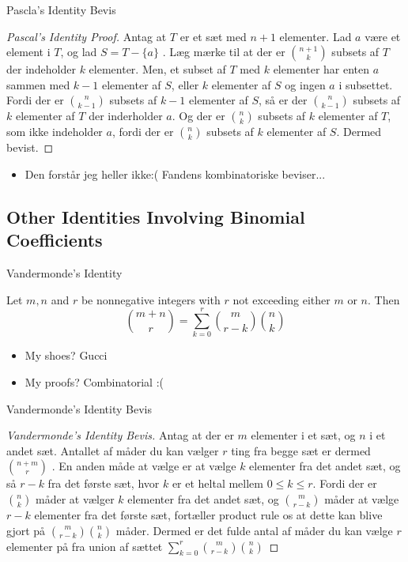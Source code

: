 \documentclass{beamer}
\begin{document}
\begin{frame}{Pascla's Identity Bevis}
   \begin{proof}[Pascal's Identity Proof]
      Antag at $T$ er et sæt med $n+1$ elementer. Lad $a$ være et element i $T$, og lad $S = T - \{a\}$ . Læg mærke til at der er $\binom{n+1}{k}$ subsets af $T$ der indeholder $k$ elementer. Men, et subset af $T$ med $k$ elementer har enten $a$ sammen med $k-1$ elementer af $S$, eller $k$ elementer af $S$ og ingen $a$ i subsettet. Fordi der er $\binom{n}{k-1}$ subsets af $k-1$ elementer af $S$, så er der $\binom{n}{k-1}$ subsets af $k$ elementer af $T$ der inderholder $a$. Og der er $\binom{n}{k}$ subsets af $k$ elementer af $T$, som ikke indeholder $a$, fordi der er $\binom{n}{k}$ subsets af $k$ elementer af $S$. Dermed bevist.
   \end{proof} 
   \begin{itemize}
       \item Den forstår jeg heller ikke:( Fandens kombinatoriske beviser...
   \end{itemize}
\end{frame}

\subsection{Other Identities Involving Binomial Coefficients}
\begin{frame}{Vandermonde's Identity}
\begin{theorem}
   Let $m,n $ and $r$ be nonnegative integers with $r$ not exceeding either $m$ or $n$. Then
   $$\binom{m+n}{r} = \sum^r_{k=0} \binom{m}{r-k} \binom{n}{k}$$
\end{theorem}
\begin{itemize}
    \item My shoes? Gucci
    \item My proofs? Combinatorial :(
\end{itemize}
\end{frame}

\begin{frame}{Vandermonde's Identity Bevis}
   \begin{proof}[Vandermonde's Identity Bevis]
      Antag at der er $m$ elementer i et sæt, og $n$ i et andet sæt. Antallet af måder du kan vælger $r$ ting fra begge sæt er dermed $\binom{n+m}{r}$ . En anden måde at vælge er at vælge $k$ elementer fra det andet sæt, og så $r-k$ fra det første sæt, hvor $k$ er et heltal mellem $0 \leq k \leq r$. Fordi der er $\binom{n}{k}$ måder at vælger $k$ elementer fra det andet sæt, og $\binom{m}{r-k}$ måder at vælge $r-k$ elementer fra det første sæt, fortæller product rule os at dette kan blive gjort på $\binom{m}{r-k}\binom{n}{k}$ måder. Dermed er det fulde antal af måder du kan vælge $r$ elementer på fra union af sættet $\sum^r_{k=0} \binom{m}{r-k}\binom{n}{k}$
   \end{proof} 
\end{frame}
\end{document}
